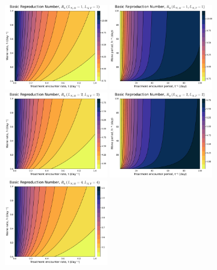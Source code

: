 \documentclass[12pt]{article}
\begin{document}
\begin{figure}[H]
    \centering
    \includegraphics[width=0.4\textwidth]{../../fig/gen_model/R0_rates_txh_1x1.pdf}
    \includegraphics[width=0.4\textwidth]{../../fig/gen_model/R0_periods_txh_1x1.pdf}\\
    \includegraphics[width=0.4\textwidth]{../../fig/gen_model/R0_rates_txh_2x2.pdf}
    \includegraphics[width=0.4\textwidth]{../../fig/gen_model/R0_periods_txh_2x2.pdf}\\
    \includegraphics[width=0.4\textwidth]{../../fig/gen_model/R0_rates_txh_4x4.pdf}

\end{figure}
\end{document}
